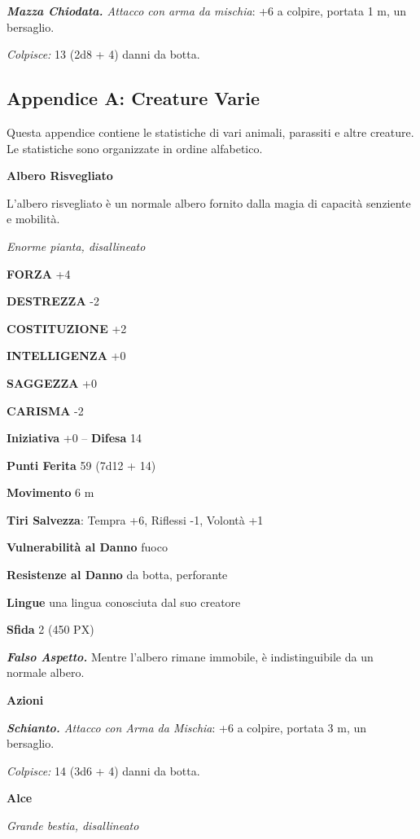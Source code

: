 \begin{multicols}{2}
	\textit{\textbf{Mazza Chiodata.} Attacco con arma da mischia}: +6 a colpire, portata 1 m, un bersaglio.

	\textit{Colpisce:} 13 (2d8 + 4) danni da botta.


	\subsection{Appendice A: Creature Varie}

	Questa appendice contiene le statistiche di vari animali, parassiti e
	altre creature. Le statistiche sono organizzate in ordine alfabetico.

	\medskip\textbf{Albero Risvegliato}

	L'albero risvegliato è un normale albero fornito dalla magia di capacità
	senziente e mobilità.

	\textit{Enorme pianta, disallineato}

	\textbf{FORZA} +4

	\textbf{DESTREZZA} -2

	\textbf{COSTITUZIONE} +2

	\textbf{INTELLIGENZA} +0

	\textbf{SAGGEZZA} +0

	\textbf{CARISMA} -2

	\textbf{Iniziativa} +0 -- \textbf{Difesa} 14

	\textbf{Punti Ferita} 59 (7d12 + 14)

	\textbf{Movimento} 6 m

	\textbf{Tiri Salvezza}: Tempra +6, Riflessi -1, Volontà +1

	\textbf{Vulnerabilità al Danno} fuoco

	\textbf{Resistenze al Danno} da botta, perforante

	\textbf{Lingue} una lingua conosciuta dal suo creatore

	\textbf{Sfida} 2 (450 PX)

	\textit{\textbf{Falso Aspetto.}} Mentre l'albero rimane immobile, è indistinguibile da un normale albero.

	\textbf{Azioni}

	\textit{\textbf{Schianto.} Attacco con Arma da Mischia}: +6 a colpire, portata 3 m, un bersaglio.

	\textit{Colpisce:} 14 (3d6 + 4) danni da botta.

	\medskip\textbf{Alce}

	\textit{Grande bestia, disallineato}


\end{multicols}
